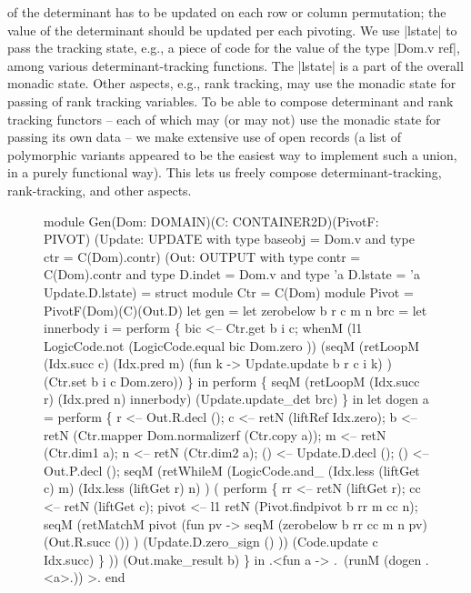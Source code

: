 \documentclass[draft]{elsart}
\begin{document}
of the determinant has to be updated on each row or column
permutation; the value of the determinant should be updated per each
pivoting. We use |lstate| to pass the tracking state, e.g., a piece of
code for the value of the type |Dom.v ref|, among
various determinant-tracking functions. The |lstate| is a part of the
overall monadic state. Other aspects, e.g., rank tracking, may use the
monadic state for passing of rank tracking variables. To be able to
compose determinant and rank tracking functors -- each of which may
(or may not) use the monadic state for passing its own data -- we make
extensive use of open records (a list of polymorphic variants
appeared to be the easiest way to implement such a union, in a purely
functional way). This lets us freely compose determinant-tracking,
rank-tracking, and other aspects.

\begin{figure}
\begin{code2}
module Gen(Dom: DOMAIN)(C: CONTAINER2D)(PivotF: PIVOT)
          (Update: UPDATE with type baseobj = Dom.v and type ctr = C(Dom).contr)
          (Out: OUTPUT with type contr = C(Dom).contr and type D.indet = Dom.v 
                        and type 'a D.lstate = 'a Update.D.lstate) = struct
    module Ctr = C(Dom)
    module Pivot = PivotF(Dom)(C)(Out.D)
    let gen =
      let zerobelow b r c m n brc =
        let innerbody i = perform \{
            bic <-- Ctr.get b i c;
            whenM (l1 LogicCode.not (LogicCode.equal bic Dom.zero ))
                (seqM (retLoopM (Idx.succ c) (Idx.pred m)
                          (fun k -> Update.update b r c i k) )
                      (Ctr.set b i c Dom.zero)) \} in 
        perform \{
              seqM (retLoopM (Idx.succ r) (Idx.pred n) innerbody) 
                   (Update.update_det brc) \} in
      let dogen a = perform \{
          r <-- Out.R.decl ();
          c <-- retN (liftRef Idx.zero);
          b <-- retN (Ctr.mapper Dom.normalizerf (Ctr.copy a));
          m <-- retN (Ctr.dim1 a);
          n <-- retN (Ctr.dim2 a);
          () <-- Update.D.decl ();
          () <-- Out.P.decl ();
          seqM 
            (retWhileM (LogicCode.and_ (Idx.less (liftGet c) m)
                                       (Idx.less (liftGet r) n) )
               ( perform \{
               rr <-- retN (liftGet r);
               cc <-- retN (liftGet c);
               pivot <-- l1 retN (Pivot.findpivot b rr m cc n);
               seqM (retMatchM pivot (fun pv -> 
                        seqM (zerobelow b rr cc m n pv)
                             (Out.R.succ ()) )
                        (Update.D.zero_sign () ))
                    (Code.update c Idx.succ) \} ))
            (Out.make_result b) \} in
    .<fun a -> .~(runM (dogen .<a>.)) >.
end
\end{code2}
\end{figure}
\end{document}
